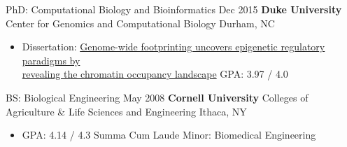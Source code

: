 
\begin{resentries}

  \resentrybeta
	{PhD: Computational Biology and Bioinformatics}
	{Dec 2015}
	{\textbf{Duke University} \xspace \bullet \xspace \xspace Center for Genomics and Computational Biology}
	{Durham, NC}
    {
      \begin{itemize}[leftmargin=*] %
		\item{Dissertation: \href{https://dukespace.lib.duke.edu/dspace/handle/10161/11371}{\color{blue} Genome-wide footprinting uncovers epigenetic regulatory paradigms by\\ revealing the chromatin occupancy landscape} \xspace \bullet \xspace \xspace GPA: 3.97 / 4.0} 
      \end{itemize}
    }

  \resentrybeta
	{BS: Biological Engineering}
	{May 2008}
	{\textbf{Cornell University} \xspace \bullet \xspace \xspace Colleges of Agriculture \& Life Sciences and Engineering}
	{Ithaca, NY}
    {
      \begin{itemize}[leftmargin=*] %
		\item{GPA: 4.14 / 4.3 \xspace \bullet \xspace \xspace Summa Cum Laude \xspace \bullet \xspace \xspace Minor: Biomedical Engineering}
      \end{itemize}
    }
\end{resentries}
